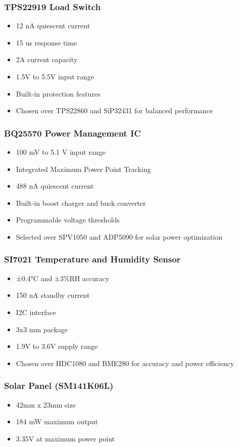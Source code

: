 \documentclass[a4paper,11pt]{article}%
\begin{document}
\subsubsection{TPS22919 Load Switch}
\begin{itemize}
    \item 12 nA quiescent current
    \item 15 us response time
    \item 2A current capacity
    \item 1.5V to 5.5V input range
    \item Built-in protection features
    \item Chosen over TPS22860 and SiP32431 for balanced performance
\end{itemize}


\subsubsection{BQ25570 Power Management IC}
\begin{itemize}
    \item 100 mV to 5.1 V input range
    \item Integrated Maximum Power Point Tracking
    \item 488 nA quiescent current
    \item Built-in boost charger and buck converter
    \item Programmable voltage thresholds
    \item Selected over SPV1050 and ADP5090 for solar power optimization
\end{itemize}


\subsubsection{SI7021 Temperature and Humidity Sensor}
\begin{itemize}
    \item ±0.4°C and ±3\%RH accuracy
    \item 150 nA standby current
    \item I2C interface
    \item 3x3 mm package
    \item 1.9V to 3.6V supply range
    \item Chosen over HDC1080 and BME280 for accuracy and power efficiency
\end{itemize}


\subsubsection{Solar Panel (SM141K06L)}
\begin{itemize}
    \item 42mm x 23mm size
    \item 184 mW maximum output
    \item 3.35V at maximum power point
\end{itemize}
\end{document}
